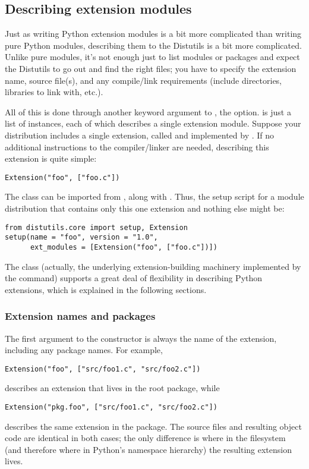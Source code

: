 \documentclass{howto}
\begin{document}
\subsection{Describing extension modules}
\label{describing-extensions}

Just as writing Python extension modules is a bit more complicated than
writing pure Python modules, describing them to the Distutils is a bit
more complicated.  Unlike pure modules, it's not enough just to list
modules or packages and expect the Distutils to go out and find the
right files; you have to specify the extension name, source file(s), and
any compile/link requirements (include directories, libraries to link
with, etc.).

All of this is done through another keyword argument to
, the  option.  
is just a list of  instances, each of which describes a
single extension module.  Suppose your distribution includes a single
extension, called  and implemented by .  If no
additional instructions to the compiler/linker are needed, describing
this extension is quite simple:
\begin{verbatim}
Extension("foo", ["foo.c"])
\end{verbatim}
The  class can be imported from
, along with .  Thus, the setup
script for a module distribution that contains only this one extension
and nothing else might be:
\begin{verbatim}
from distutils.core import setup, Extension
setup(name = "foo", version = "1.0",
      ext_modules = [Extension("foo", ["foo.c"])])
\end{verbatim}

The  class (actually, the underlying extension-building
machinery implemented by the  command) supports a
great deal of flexibility in describing Python extensions, which is
explained in the following sections.  


\subsubsection{Extension names and packages}

The first argument to the  constructor is always the
name of the extension, including any package names.  For example,
\begin{verbatim}
Extension("foo", ["src/foo1.c", "src/foo2.c"])
\end{verbatim}
describes an extension that lives in the root package, while
\begin{verbatim}
Extension("pkg.foo", ["src/foo1.c", "src/foo2.c"])
\end{verbatim}
describes the same extension in the  package.  The source
files and resulting object code are identical in both cases; the only
difference is where in the filesystem (and therefore where in Python's
namespace hierarchy) the resulting extension lives.
\end{document}
